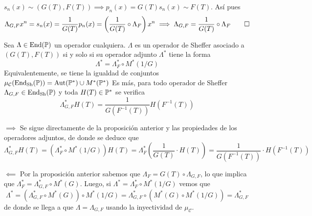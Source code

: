 \begin{demo}
    $s_n(x) \sim (G(T), F(T)) \implies p_n(x) = G(T)s_n(x) \sim F(T)$. Así pues
    \begin{equation*}
        \Lambda_{G,F}x^n = s_n(x) = \frac{1}{G(T)} p_n(x) = \left(\frac{1}{G(T)} \circ \Lambda_{F}\right) x^n \implies \Lambda_{G,F} = \frac{1}{G(T)} \circ \Lambda_{F} \qedhere
    \end{equation*}
\end{demo}

\begin{teorema}
    Sea $\Lambda \in \operatorname*{End}(\mathbb{P})$ un operador cualquiera. $\Lambda$ es un operador de Sheffer asociado a $(G(T), F(T))$ si y solo si su operador adjunto $\Lambda^*$ tiene la forma
    \begin{equation*}
        \Lambda^* = \Lambda_{F}^* \circ M^*(1/G)
    \end{equation*}
    Equivalentemente, se tiene la igualdad de conjuntos $\mu_{\mathcal{C}}(\operatorname*{End}_{\mathrm{Sh}}(\mathbb{P})) = \operatorname*{Aut}(\mathbb{P}^*) \cup M^*(\mathbb{P}^*)$ Es más, para todo operador de Sheffer $\Lambda_{G,F} \in \operatorname*{End}_{\mathrm{Sh}}(\mathbb{P})$ y toda $H(T) \in \mathbb{P}^*$ se verifica
    \begin{equation*}
        \Lambda_{G,F}^*H(T) = \frac{1}{G(F^{-1}(T))} H(F^{-1}(T)) 
    \end{equation*}
\end{teorema}

\begin{demo}
    $\boxed{\implies}$
    Se sigue directamente de la proposición anterior y las propiedades de los operadores adjuntos, de donde se deduce que
    \begin{equation*}
        \Lambda_{G,F}^*H(T) = (\Lambda_{F}^* \circ M^*(1/G))H(T) = \Lambda_{F}^*\left(\frac{1}{G(T)} \cdot H(T)\right) = \frac{1}{G(F^{-1}(T))} \cdot H(F^{-1}(T)) 
    \end{equation*}

    $\boxed{\impliedby}$
    Por la proposición anterior sabemos que $\Lambda_F = G(T) \circ \Lambda_{G,F}$, lo que implica que $\Lambda_F^* = \Lambda_{G,F}^* \circ M^*(G)$. Luego, si $\Lambda^* = \Lambda_{F}^* \circ M^*(1/G)$ vemos que
    \begin{equation*}
        \Lambda^* = (\Lambda_{G,F}^* \circ M^*(G)) \circ M^*(1/G) = \Lambda_{G,F}^* \circ (M^*(G) \circ M^*(1/G)) = \Lambda_{G,F}^* 
    \end{equation*}
    de donde se llega a que $\Lambda = \Lambda_{G,F}$ usando la inyectividad de $\mu_{\mathcal{C}}$. 
\end{demo}

